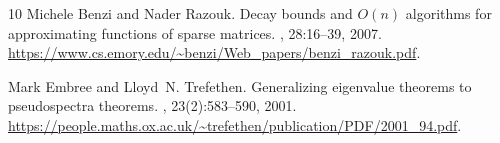 \documentclass[11pt]{article}
\theoremstyle{definition}
\theoremstyle{remark}
\begin{document}
\begin{thebibliography}{10}
Michele Benzi and Nader Razouk.
\newblock Decay bounds and {$O(n)$} algorithms for approximating functions of
  sparse matrices.
, 28:16--39, 2007.
\newblock \url{https://www.cs.emory.edu/~benzi/Web_papers/benzi_razouk.pdf}.

Mark Embree and Lloyd~N. Trefethen.
\newblock Generalizing eigenvalue theorems to pseudospectra theorems.
, 23(2):583--590, 2001.
\newblock
  \url{https://people.maths.ox.ac.uk/~trefethen/publication/PDF/2001_94.pdf}.

\end{thebibliography}
\end{document}
